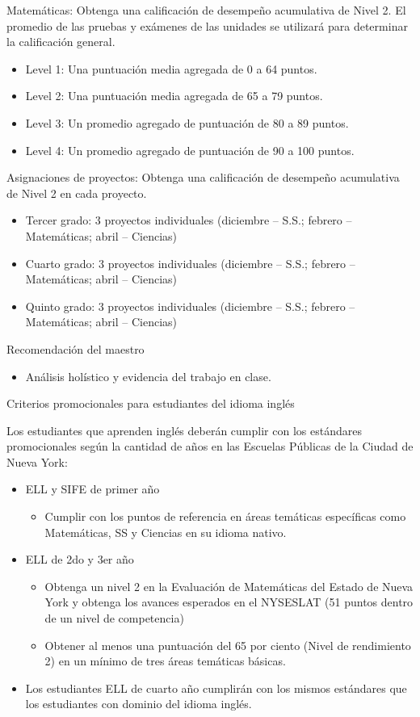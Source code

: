 \documentclass[12pt,letterpaper]{article}
\begin{document}
Matemáticas: Obtenga una calificación de desempeño acumulativa de Nivel 2. El promedio de las pruebas y exámenes de las unidades se utilizará para determinar la calificación general.
\begin{itemize}
\item Level 1: Una puntuación media agregada de 0 a 64 puntos.
\item Level 2: Una puntuación media agregada de 65 a 79 puntos.
\item Level 3: Un promedio agregado de puntuación de 80 a 89 puntos.
\item Level 4: Un promedio agregado de puntuación de 90 a 100 puntos.
\end{itemize}

Asignaciones de proyectos: Obtenga una calificación de desempeño acumulativa de Nivel 2 en cada proyecto.
\begin{itemize}
\item Tercer grado: 3 proyectos individuales (diciembre – S.S.; febrero – Matemáticas; abril – Ciencias)
\item Cuarto grado: 3 proyectos individuales (diciembre – S.S.; febrero – Matemáticas; abril – Ciencias)
\item Quinto grado: 3 proyectos individuales (diciembre – S.S.; febrero – Matemáticas; abril – Ciencias)
\end{itemize}
Recomendación del maestro
\begin{itemize}
\item Análisis holístico y evidencia del trabajo en clase.
\end{itemize}

Criterios promocionales para estudiantes del idioma inglés

Los estudiantes que aprenden inglés deberán cumplir con los estándares promocionales según la cantidad de años en las Escuelas Públicas de la Ciudad de Nueva York:
\pagebreak
\vspace*{1.5cm}
\begin{itemize}
\item ELL y SIFE de primer año
	\begin{itemize}
	\item Cumplir con los puntos de referencia en áreas temáticas específicas como Matemáticas, SS y Ciencias en su idioma nativo.
	\end{itemize}
\item ELL de 2do y 3er año
	\begin{itemize}
	\item Obtenga un nivel 2 en la Evaluación de Matemáticas del Estado de Nueva York y obtenga los avances esperados en el NYSESLAT (51 puntos dentro de un nivel de competencia)
	\item Obtener al menos una puntuación del 65 por ciento (Nivel de rendimiento 2) en un mínimo de tres áreas temáticas básicas.
	\end{itemize}
\item Los estudiantes ELL de cuarto año cumplirán con los mismos estándares que los estudiantes con dominio del idioma inglés.
\end{itemize}
\end{document}

